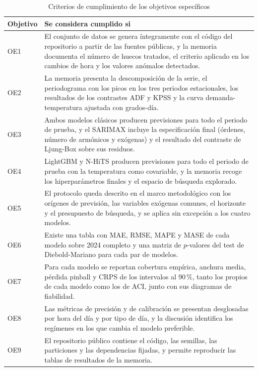 \begin{table}[htbp]
	\centering
	\caption{Criterios de cumplimiento de los objetivos específicos}
	\label{tab:criterios}
	\small
	\begin{tabularx}{\textwidth}{l X}
		\hline
		\textbf{Objetivo} & \textbf{Se considera cumplido si} \\
		\hline
		OE1 & El conjunto de datos se genera íntegramente con el código del repositorio a partir de las fuentes públicas, y la memoria documenta el número de huecos tratados, el criterio aplicado en los cambios de hora y los valores anómalos detectados. \\
		OE2 & La memoria presenta la descomposición de la serie, el periodograma con los picos en los tres periodos estacionales, los resultados de los contrastes ADF y KPSS y la curva demanda-temperatura ajustada con grados-día. \\
		OE3 & Ambos modelos clásicos producen previsiones para todo el periodo de prueba, y el SARIMAX incluye la especificación final (órdenes, número de armónicos y exógenas) y el resultado del contraste de Ljung-Box sobre sus residuos. \\
		OE4 & LightGBM y N-HiTS producen previsiones para todo el periodo de prueba con la temperatura como covariable, y la memoria recoge los hiperparámetros finales y el espacio de búsqueda explorado. \\
		OE5 & El protocolo queda descrito en el marco metodológico con los orígenes de previsión, las variables exógenas comunes, el horizonte y el presupuesto de búsqueda, y se aplica sin excepción a los cuatro modelos. \\
		OE6 & Existe una tabla con MAE, RMSE, MAPE y MASE de cada modelo sobre 2024 completo y una matriz de $p$-valores del test de Diebold-Mariano para cada par de modelos. \\
		OE7 & Para cada modelo se reportan cobertura empírica, anchura media, pérdida pinball y CRPS de los intervalos al 90\,\%, tanto los propios de cada modelo como los de ACI, junto con sus diagramas de fiabilidad. \\
		OE8 & Las métricas de precisión y de calibración se presentan desglosadas por hora del día y por tipo de día, y la discusión identifica los regímenes en los que cambia el modelo preferible. \\
		OE9 & El repositorio público contiene el código, las semillas, las particiones y las dependencias fijadas, y permite reproducir las tablas de resultados de la memoria. \\
		\hline
	\end{tabularx}
\end{table}
